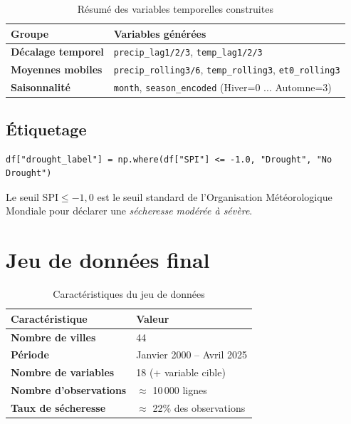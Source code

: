 \documentclass[12pt,a4paper]{report}
\begin{document}
\begin{table}[H]
    \centering
    \begin{tabular}{>{\bfseries}p{4cm}p{9cm}}
        \toprule
        Groupe & Variables générées \\
        \midrule
        Décalage temporel & \texttt{precip\_lag1/2/3}, \texttt{temp\_lag1/2/3} \\
        Moyennes mobiles & \texttt{precip\_rolling3/6}, \texttt{temp\_rolling3}, \texttt{et0\_rolling3} \\
        Saisonnalité & \texttt{month}, \texttt{season\_encoded} (Hiver=0 ... Automne=3) \\
        \bottomrule
    \end{tabular}
    \caption{Résumé des variables temporelles construites}
\end{table}

\subsection{Étiquetage}

\begin{lstlisting}[style=pythonStyle, caption={Étiquetage binaire basé sur le seuil SPI OMM}]
df["drought_label"] = np.where(df["SPI"] <= -1.0, "Drought", "No Drought")
\end{lstlisting}

Le seuil $\text{SPI} \leq -1{,}0$ est le seuil standard de l'Organisation Météorologique Mondiale pour déclarer une \textit{sécheresse modérée à sévère}.

\section{Jeu de données final}

\begin{table}[H]
    \centering
    \begin{tabular}{>{\bfseries}p{5cm}p{7cm}}
        \toprule
        Caractéristique & Valeur \\
        \midrule
        Nombre de villes & 44 \\
        Période & Janvier 2000 – Avril 2025 \\
        Nombre de variables & 18 (+ variable cible) \\
        Nombre d'observations & $\approx$ 10\,000 lignes \\
        Taux de sécheresse & $\approx$ 22\% des observations \\
        \bottomrule
    \end{tabular}
    \caption{Caractéristiques du jeu de données}
\end{table}
\end{document}
